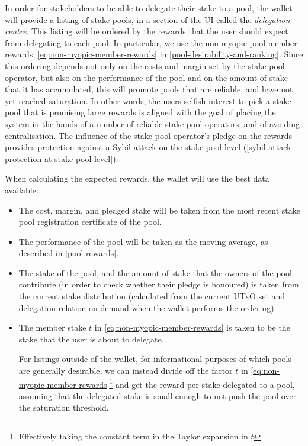 \documentclass[11pt,a4paper]{article}
\begin{document}
In order for stakeholders to be able to delegate their stake to a pool,
the wallet will provide a listing of stake pools, in a section of the UI
called the \emph{delegation centre}. This listing will be ordered by
the rewards that the user should expect from delegating to each pool. In
particular, we use the non-myopic pool member rewards,
\cref{eq:non-myopic-member-rewards} in \cref{pool-desirability-and-ranking}.
Since this ordering depends not only on the costs and margin set
by the stake pool operator, but also on the performance of the pool and
on the amount of stake that it has accumulated, this will promote pools
that are reliable, and have not yet reached saturation. In other words,
the users selfish interest to pick a stake pool that is promising large
rewards is aligned with the goal of placing the system in the hands of a
number of reliable stake pool operators, and of avoiding centralisation.
The influence of the stake pool operator's pledge on the rewards
provides protection against a Sybil attack on the stake pool level
(\cref{sybil-attack-protection-at-stake-pool-level}).

When calculating the expected rewards, the wallet will use the
best data available:
\begin{itemize}
\item The cost, margin, and pledged stake will be taken from the most
  recent stake pool registration certificate of the pool.
\item The performance of the pool will be taken as the moving average, as
  described in \cref{pool-rewards}.
\item The stake of the pool, and the amount of stake that the owners
  of the pool contribute (in order to check whether their pledge is
  honoured) is taken from the current stake distribution (calculated
  from the current UTxO set and delegation relation on demand when the
  wallet performs the ordering).
\item The member stake \(t\) in \cref{eq:non-myopic-member-rewards} is taken to
  be the stake that the user is about to delegate.

  For listings outside of the wallet, for informational purposes of which pools
  are generally desirable, we can instead divide off the factor \(t\) in
  \cref{eq:non-myopic-member-rewards}\footnote{Effectively taking the constant
    term in the Taylor expansion in \(t\)} and get the reward per stake
  delegated to a pool, assuming that the delegated stake is small enough to not
  push the pool over the saturation threshold.
\end{itemize}
\end{document}
